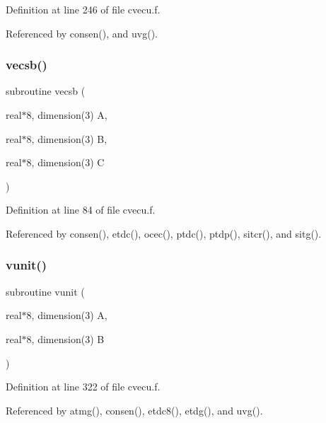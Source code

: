 Definition at line 246 of file cvecu.\+f.



Referenced by consen(), and uvg().

\mbox{\label{cvecu_8f_a6a89e2feb2a4f077a63790728a419430}} 
\subsubsection{\texorpdfstring{vecsb()}{vecsb()}}
{\footnotesize\ttfamily subroutine vecsb (\begin{DoxyParamCaption}\item[{real$\ast$8, dimension(3)}]{A,  }\item[{real$\ast$8, dimension(3)}]{B,  }\item[{real$\ast$8, dimension(3)}]{C }\end{DoxyParamCaption})}



Definition at line 84 of file cvecu.\+f.



Referenced by consen(), etdc(), ocec(), ptdc(), ptdp(), sitcr(), and sitg().

\mbox{\label{cvecu_8f_aae62c79991a1deff14e6de9f607c76cb}} 
\subsubsection{\texorpdfstring{vunit()}{vunit()}}
{\footnotesize\ttfamily subroutine vunit (\begin{DoxyParamCaption}\item[{real$\ast$8, dimension(3)}]{A,  }\item[{real$\ast$8, dimension(3)}]{B }\end{DoxyParamCaption})}



Definition at line 322 of file cvecu.\+f.



Referenced by atmg(), consen(), etdc8(), etdg(), and uvg().

